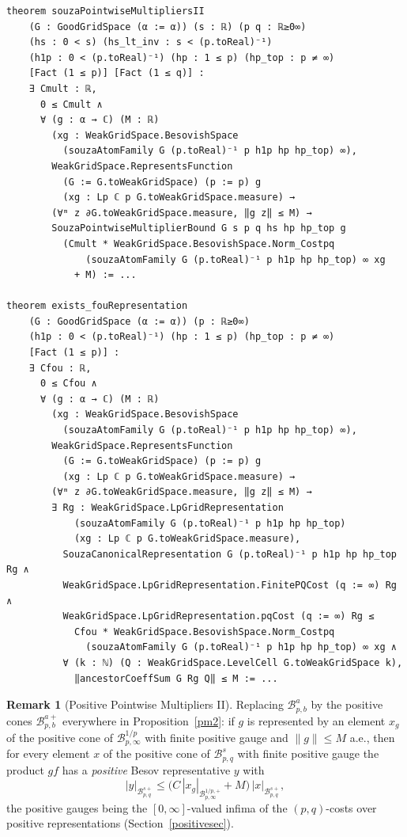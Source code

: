 \documentclass[11pt]{amsart}
\theoremstyle{definition}
\newtheorem{remark}[theorem]{Remark}
\begin{document}
\begin{lstlisting}[style=lean,basicstyle=\ttfamily\scriptsize]
theorem souzaPointwiseMultipliersII
    (G : GoodGridSpace (α := α)) (s : ℝ) (p q : ℝ≥0∞)
    (hs : 0 < s) (hs_lt_inv : s < (p.toReal)⁻¹)
    (h1p : 0 < (p.toReal)⁻¹) (hp : 1 ≤ p) (hp_top : p ≠ ∞)
    [Fact (1 ≤ p)] [Fact (1 ≤ q)] :
    ∃ Cmult : ℝ,
      0 ≤ Cmult ∧
      ∀ (g : α → ℂ) (M : ℝ)
        (xg : WeakGridSpace.BesovishSpace
          (souzaAtomFamily G (p.toReal)⁻¹ p h1p hp hp_top) ∞),
        WeakGridSpace.RepresentsFunction
          (G := G.toWeakGridSpace) (p := p) g
          (xg : Lp ℂ p G.toWeakGridSpace.measure) →
        (∀ᵐ z ∂G.toWeakGridSpace.measure, ‖g z‖ ≤ M) →
        SouzaPointwiseMultiplierBound G s p q hs hp hp_top g
          (Cmult * WeakGridSpace.BesovishSpace.Norm_Costpq
              (souzaAtomFamily G (p.toReal)⁻¹ p h1p hp hp_top) ∞ xg
            + M) := ...

theorem exists_fouRepresentation
    (G : GoodGridSpace (α := α)) (p : ℝ≥0∞)
    (h1p : 0 < (p.toReal)⁻¹) (hp : 1 ≤ p) (hp_top : p ≠ ∞)
    [Fact (1 ≤ p)] :
    ∃ Cfou : ℝ,
      0 ≤ Cfou ∧
      ∀ (g : α → ℂ) (M : ℝ)
        (xg : WeakGridSpace.BesovishSpace
          (souzaAtomFamily G (p.toReal)⁻¹ p h1p hp hp_top) ∞),
        WeakGridSpace.RepresentsFunction
          (G := G.toWeakGridSpace) (p := p) g
          (xg : Lp ℂ p G.toWeakGridSpace.measure) →
        (∀ᵐ z ∂G.toWeakGridSpace.measure, ‖g z‖ ≤ M) →
        ∃ Rg : WeakGridSpace.LpGridRepresentation
            (souzaAtomFamily G (p.toReal)⁻¹ p h1p hp hp_top)
            (xg : Lp ℂ p G.toWeakGridSpace.measure),
          SouzaCanonicalRepresentation G (p.toReal)⁻¹ p h1p hp hp_top Rg ∧
          WeakGridSpace.LpGridRepresentation.FinitePQCost (q := ∞) Rg ∧
          WeakGridSpace.LpGridRepresentation.pqCost (q := ∞) Rg ≤
            Cfou * WeakGridSpace.BesovishSpace.Norm_Costpq
              (souzaAtomFamily G (p.toReal)⁻¹ p h1p hp hp_top) ∞ xg ∧
          ∀ (k : ℕ) (Q : WeakGridSpace.LevelCell G.toWeakGridSpace k),
            ‖ancestorCoeffSum G Rg Q‖ ≤ M := ...
\end{lstlisting}

\begin{remark}[Positive Pointwise Multipliers II]\label{pos3}
Replacing $\mathcal{B}^a_{p,b}$ by the positive cones
$\mathcal{B}^{a+}_{p,b}$ everywhere in Proposition~\ref{pm2}: if $g$ is
represented by an element $x_g$ of the positive cone of
$\mathcal{B}^{1/p}_{p,\infty}$ with finite positive gauge and
$\|g\| \leq M$ a.e., then for every element $x$ of the positive cone of
$\mathcal{B}^s_{p,q}$ with finite positive gauge the product $g f$ has a
\emph{positive} Besov representative $y$ with
$$|y|_{\mathcal{B}^{s+}_{p,q}} \leq
\big(C\,|x_g|_{\mathcal{B}^{1/p,+}_{p,\infty}} + M\big)\,
|x|_{\mathcal{B}^{s+}_{p,q}},$$
the positive gauges being the $[0,\infty]$-valued infima of the
$(p,q)$-costs over positive representations (Section~\ref{positivesec}).
\end{remark}
\end{document}
